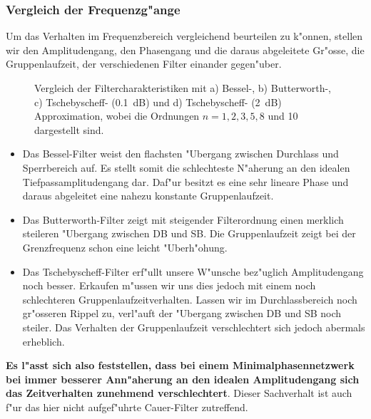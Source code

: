 \subsubsection{Vergleich der Frequenzg"ange}
Um das Verhalten im Frequenzbereich vergleichend beurteilen zu k"onnen,
stellen wir den Amplitudengang, den Phasengang und die daraus abgeleitete
Gr"osse, die Gruppenlaufzeit, der verschiedenen Filter einander gegen"uber.
\begin{figure}[!htb] %
\vspace*{-3mm}\begin{center}
  \vspace*{-7mm}\caption{Vergleich der Filtercharakteristiken mit a) Bessel-, b) Butterworth-, c) Tschebyscheff- (0.1~dB) und d) Tschebyscheff- (2~dB) Approximation, wobei die Ordnungen $n=1,2,3,5,8$ und 10 dargestellt sind.}
\end{center}
\vspace*{-6mm}
\end{figure}

\begin{itemize}
\item Das Bessel-Filter weist den flachsten "Ubergang zwischen Durchlass und  
Sperrbereich auf. Es stellt somit die schlechteste N"aherung an den idealen  
Tiefpassamplitudengang dar. Daf"ur besitzt es eine sehr lineare Phase und  
daraus abgeleitet eine nahezu konstante Gruppenlaufzeit.

\item Das Butterworth-Filter zeigt mit steigender Filterordnung einen merklich  
steileren "Ubergang zwischen DB und SB. Die Gruppenlaufzeit zeigt bei der  
Grenzfrequenz schon eine leicht "Uberh"ohung.

\item Das Tschebyscheff-Filter erf"ullt unsere W"unsche bez"uglich Amplitudengang
noch besser. Erkaufen m"ussen wir uns dies jedoch mit einem noch
schlechteren Gruppenlaufzeitverhalten. Lassen wir im Durchlassbereich noch
gr"osseren Rippel zu, verl"auft der "Ubergang zwischen DB und SB noch
steiler. Das Verhalten der Gruppenlaufzeit verschlechtert sich jedoch abermals
erheblich.
\end{itemize}
{\bf Es l"asst sich also feststellen, dass bei einem Minimalphasennetzwerk bei
immer besserer Ann"aherung an den idealen Amplitudengang sich das
Zeitverhalten zunehmend verschlechtert}. Dieser Sachverhalt ist auch f"ur das hier
nicht aufgef"uhrte Cauer-Filter zutreffend.

